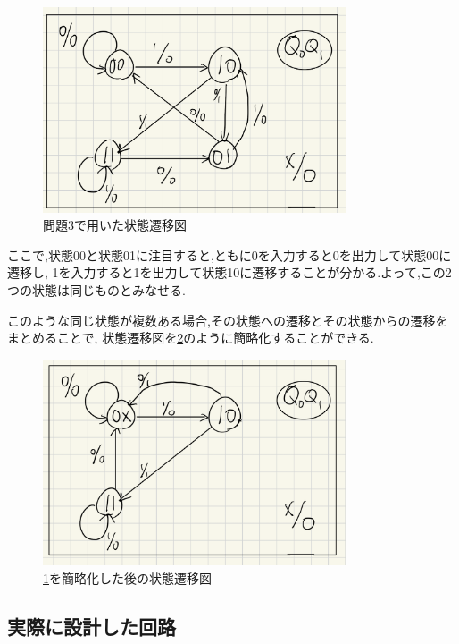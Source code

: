 \documentclass[autodetect-engine, dvi=dvipdfmx, 10pt, a4paper, ja=standard]{bxjsarticle}
\begin{document}
\begin{figure}[H]
	\centering
	\includegraphics[width=0.8\textwidth]{asset/ex3_state.png}
	\caption{問題3で用いた状態遷移図}
	\label{fig:ex3-state}
\end{figure}

ここで,状態00と状態01に注目すると,ともに0を入力すると0を出力して状態00に遷移し,
1を入力すると1を出力して状態10に遷移することが分かる.よって,この2つの状態は同じものとみなせる.

このような同じ状態が複数ある場合,その状態への遷移とその状態からの遷移をまとめることで,
状態遷移図を\ref{fig:ex3-state-refine}のように簡略化することができる.

\begin{figure}[H]
	\centering
	\includegraphics[width=0.8\textwidth]{asset/ex3_state_refine.png}
	\caption{\ref{fig:ex3-state}を簡略化した後の状態遷移図}
	\label{fig:ex3-state-refine}
\end{figure}

\subsection{実際に設計した回路}
\end{document}

